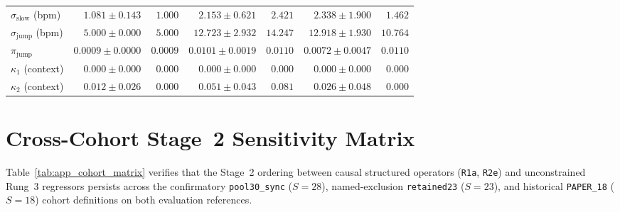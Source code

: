 \begin{table}[htbp]
\begin{tabularx}{\textwidth}{@{}>{\raggedright\arraybackslash}X rr rr rr@{}}
    $\sigma_{\mathrm{slow}}$ (bpm) & $1.081 \pm 0.143$ & $1.000$ & $2.153 \pm 0.621$ & $2.421$ & $2.338 \pm 1.900$ & $1.462$ \\
    $\sigma_{\mathrm{jump}}$ (bpm) & $5.000 \pm 0.000$ & $5.000$ & $12.723 \pm 2.932$ & $14.247$ & $12.918 \pm 1.930$ & $10.764$ \\
    $\pi_{\mathrm{jump}}$ & $0.0009 \pm 0.0000$ & $0.0009$ & $0.0101 \pm 0.0019$ & $0.0110$ & $0.0072 \pm 0.0047$ & $0.0110$ \\
    $\kappa_1$ (context) & $0.000 \pm 0.000$ & $0.000$ & $0.000 \pm 0.000$ & $0.000$ & $0.000 \pm 0.000$ & $0.000$ \\
    $\kappa_2$ (context) & $0.012 \pm 0.026$ & $0.000$ & $0.051 \pm 0.043$ & $0.081$ & $0.026 \pm 0.048$ & $0.000$ \\
    \bottomrule
  \end{tabularx}
\end{table}

\section{Cross-Cohort Stage~2 Sensitivity Matrix}
\label{app:sec_cohort_matrix}

Table~\ref{tab:app_cohort_matrix} verifies that the Stage~2 ordering between causal structured
operators (\texttt{R1a}, \texttt{R2e}) and unconstrained Rung~3 regressors persists across the
confirmatory \texttt{pool30\_sync} ($S=28$), named-exclusion \texttt{retained23} ($S=23$), and
historical \texttt{PAPER\_18} ($S=18$) cohort definitions on both evaluation references.

